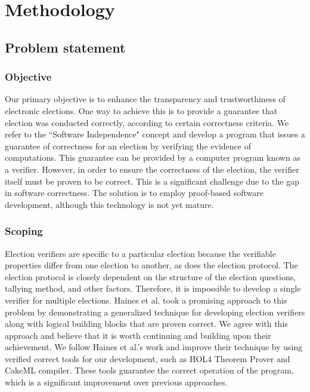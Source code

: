 \chapter{Methodology}

\section{Problem statement}
    \subsection{Objective}
    Our primary objective is to enhance the transparency and trustworthiness of electronic elections. One way to achieve this is to provide a guarantee that election was conducted correctly, according to certain correctness criteria. We refer to the ``Software Independence" concept \cite{Rivest2008OnTN} and develop a program that issues a guarantee of correctness for an election by verifying the evidence of computations. This guarantee can be provided by a computer program known as a verifier.
    However, in order to ensure the correctness of the election, the verifier itself must be proven to be correct. This is a significant challenge due to the gap in software correctness. The solution is to employ proof-based software development, although this technology is not yet mature.

    \subsection{Scoping}
    Election verifiers are specific to a particular election because the verifiable properties differ from one election to another, as does the election protocol. The election protocol is closely dependent on the structure of the election questions, tallying method, and other factors. Therefore, it is impossible to develop a single verifier for multiple elections.
    Haines et al. \cite{Haines2019VerifiedVF} took a promising approach to this problem by demonstrating a generalized technique for developing election verifiers along with logical building blocks that are proven correct. We agree with this approach and believe that it is worth continuing and building upon their achievement.
    We follow Haines et al.'s work and improve their technique by using verified correct tools for our development, such as HOL4 Theorem Prover and CakeML compiler. These tools guarantee the correct operation of the program, which is a significant improvement over previous approaches. 

